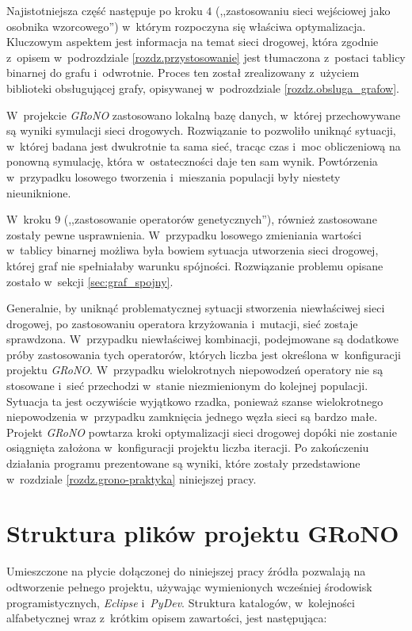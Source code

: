 \documentclass[twoside,12pt]{report}
\begin{document}
Najistotniejsza część następuje po kroku $4$ (,,zastosowaniu sieci wejściowej jako osobnika wzorcowego'') w~którym rozpoczyna się właściwa optymalizacja. Kluczowym aspektem jest informacja na temat sieci drogowej, która zgodnie z~opisem w~podrozdziale \ref{rozdz.przystosowanie} jest tłumaczona z~postaci tablicy binarnej do grafu i~odwrotnie. Proces ten został zrealizowany z~użyciem biblioteki obsługującej grafy, opisywanej w~podrozdziale \ref{rozdz.obsluga_grafow}. 

W~projekcie \textit{GRoNO} zastosowano lokalną bazę danych, w~której przechowywane są wyniki symulacji sieci drogowych. Rozwiązanie to pozwoliło uniknąć sytuacji, w~której badana jest dwukrotnie ta sama sieć, tracąc czas i~moc obliczeniową na ponowną symulację, która w~ostateczności daje ten sam wynik. Powtórzenia w~przypadku losowego tworzenia i~mieszania populacji były niestety nieuniknione.

W~kroku $9$ (,,zastosowanie operatorów genetycznych''), również zastosowane zostały pewne usprawnienia. W~przypadku losowego zmieniania wartości w~tablicy binarnej możliwa była bowiem sytuacja utworzenia sieci drogowej, której graf nie spełniałaby warunku spójności. Rozwiązanie problemu opisane zostało w~sekcji \ref{sec:graf_spojny}. 

Generalnie, by uniknąć problematycznej sytuacji stworzenia niewłaściwej sieci drogowej, po zastosowaniu operatora krzyżowania i~mutacji, sieć zostaje sprawdzona. W~przypadku niewłaściwej kombinacji, podejmowane są dodatkowe próby zastosowania tych operatorów, których liczba jest określona w~konfiguracji projektu \textit{GRoNO}. W~przypadku wielokrotnych niepowodzeń operatory nie są stosowane i~sieć przechodzi w~stanie niezmienionym do kolejnej populacji. Sytuacja ta jest oczywiście wyjątkowo rzadka, ponieważ szanse wielokrotnego niepowodzenia w~przypadku zamknięcia jednego węzła sieci są bardzo małe. Projekt \textit{GRoNO} powtarza kroki optymalizacji sieci drogowej dopóki nie zostanie osiągnięta założona w~konfiguracji projektu liczba iteracji. Po zakończeniu działania programu prezentowane są wyniki, które zostały przedstawione w~rozdziale \ref{rozdz.grono-praktyka} niniejszej pracy.

\section{Struktura plików projektu GRoNO}
Umieszczone na płycie dołączonej do niniejszej pracy źródła pozwalają na odtworzenie pełnego projektu, używając wymienionych wcześniej środowisk programistycznych, \textit{Eclipse} i~\textit{PyDev}. Struktura katalogów, w~kolejności alfabetycznej wraz z~krótkim opisem zawartości, jest następująca:
\end{document}
